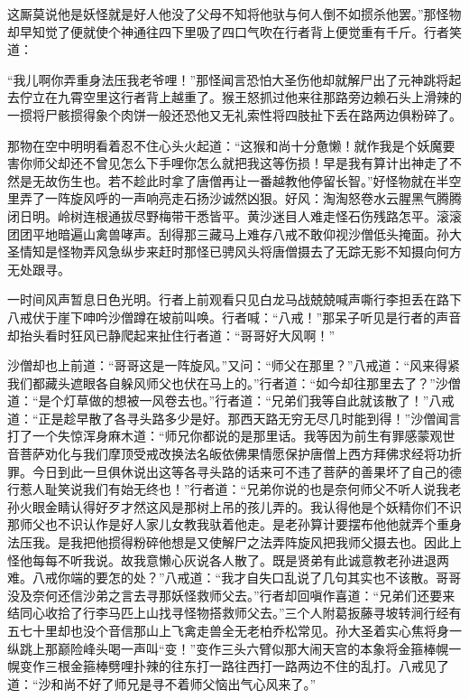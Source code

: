 \documentclass[12pt,UTF8]{ctexbook}
\begin{document}
这厮莫说他是妖怪就是好人他没了父母不知将他驮与何人倒不如掼杀他罢。”那怪物却早知觉了便就使个神通往四下里吸了四口气吹在行者背上便觉重有千斤。行者笑道：

“我儿啊你弄重身法压我老爷哩！”那怪闻言恐怕大圣伤他却就解尸出了元神跳将起去佇立在九霄空里这行者背上越重了。猴王怒抓过他来往那路旁边赖石头上滑辣的一掼将尸骸掼得象个肉饼一般还恐他又无礼索性将四肢扯下丢在路两边俱粉碎了。

那物在空中明明看着忍不住心头火起道：“这猴和尚十分惫懒！就作我是个妖魔要害你师父却还不曾见怎么下手哩你怎么就把我这等伤损！早是我有算计出神走了不然是无故伤生也。若不趁此时拿了唐僧再让一番越教他停留长智。”好怪物就在半空里弄了一阵旋风呼的一声响亮走石扬沙诚然凶狠。好风：淘淘怒卷水云腥黑气腾腾闭日明。岭树连根通拔尽野梅带干悉皆平。黄沙迷目人难走怪石伤残路怎平。滚滚团团平地暗遍山禽兽哮声。刮得那三藏马上难存八戒不敢仰视沙僧低头掩面。孙大圣情知是怪物弄风急纵步来赶时那怪已骋风头将唐僧摄去了无踪无影不知摄向何方无处跟寻。

一时间风声暂息日色光明。行者上前观看只见白龙马战兢兢喊声嘶行李担丢在路下八戒伏于崖下呻吟沙僧蹲在坡前叫唤。行者喊：“八戒！”那呆子听见是行者的声音却抬头看时狂风已静爬起来扯住行者道：“哥哥好大风啊！”

沙僧却也上前道：“哥哥这是一阵旋风。”又问：“师父在那里？”八戒道：“风来得紧我们都藏头遮眼各自躲风师父也伏在马上的。”行者道：“如今却往那里去了？”沙僧道：“是个灯草做的想被一风卷去也。”行者道：“兄弟们我等自此就该散了！”八戒道：“正是趁早散了各寻头路多少是好。那西天路无穷无尽几时能到得！”沙僧闻言打了一个失惊浑身麻木道：“师兄你都说的是那里话。我等因为前生有罪感蒙观世音菩萨劝化与我们摩顶受戒改换法名皈依佛果情愿保护唐僧上西方拜佛求经将功折罪。今日到此一旦俱休说出这等各寻头路的话来可不违了菩萨的善果坏了自己的德行惹人耻笑说我们有始无终也！”行者道：“兄弟你说的也是奈何师父不听人说我老孙火眼金睛认得好歹才然这风是那树上吊的孩儿弄的。我认得他是个妖精你们不识那师父也不识认作是好人家儿女教我驮着他走。是老孙算计要摆布他他就弄个重身法压我。是我把他掼得粉碎他想是又使解尸之法弄阵旋风把我师父摄去也。因此上怪他每每不听我说。故我意懒心灰说各人散了。既是贤弟有此诚意教老孙进退两难。八戒你端的要怎的处？”八戒道：“我才自失口乱说了几句其实也不该散。哥哥没及奈何还信沙弟之言去寻那妖怪救师父去。”行者却回嗔作喜道：“兄弟们还要来结同心收拾了行李马匹上山找寻怪物搭救师父去。”三个人附葛扳藤寻坡转涧行经有五七十里却也没个音信那山上飞禽走兽全无老柏乔松常见。孙大圣着实心焦将身一纵跳上那巅险峰头喝一声叫“变！”变作三头六臂似那大闹天宫的本象将金箍棒幌一幌变作三根金箍棒劈哩扑辣的往东打一路往西打一路两边不住的乱打。八戒见了道：“沙和尚不好了师兄是寻不着师父恼出气心风来了。”
\end{document}
